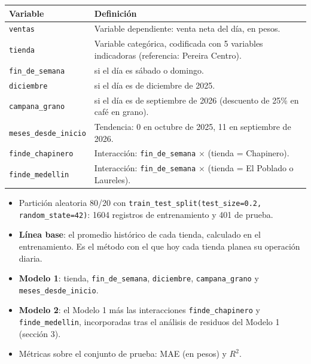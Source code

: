 \documentclass[11pt]{article}
\newcommand{\seccion}[1]{\par\vspace{6pt}{\large\bfseries\color{esumerNavy} #1}\par\vspace{1pt}}
\begin{document}
\small
\renewcommand{\arraystretch}{1.12}
\begin{tabularx}{\textwidth}{@{}>{\raggedright\arraybackslash}p{4.3cm} >{\raggedright\arraybackslash}X@{}}
\toprule
\textbf{Variable} & \textbf{Definición}\\
\midrule
\texttt{ventas} & Variable dependiente: venta neta del día, en pesos.\\
\texttt{tienda} & Variable categórica, codificada con 5 variables indicadoras (referencia: Pereira Centro).\\
\texttt{fin\_de\_semana} & 1 si el día es sábado o domingo.\\
\texttt{diciembre} & 1 si el día es de diciembre de 2025.\\
\texttt{campana\_grano} & 1 si el día es de septiembre de 2026 (descuento de 25\% en café en grano).\\
\texttt{meses\_desde\_inicio} & Tendencia: 0 en octubre de 2025, 11 en septiembre de 2026.\\
\texttt{finde\_chapinero} & Interacción: \texttt{fin\_de\_semana} $\times$ (tienda = Chapinero).\\
\texttt{finde\_medellin} & Interacción: \texttt{fin\_de\_semana} $\times$ (tienda = El Poblado o Laureles).\\
\bottomrule
\end{tabularx}\par
\renewcommand{\arraystretch}{1.0}
\normalsize

\seccion{2. Metodología}

\begin{itemize}[itemsep=1pt, topsep=1pt]
  \item Partición aleatoria 80/20 con \texttt{train\_test\_split(test\_size=0.2,
    random\_state=42)}: 1604 registros de entrenamiento y 401 de prueba.
  \item \textbf{Línea base}: el promedio histórico de cada tienda, calculado en
    el entrenamiento. Es el método con el que hoy cada tienda planea su
    operación diaria.
  \item \textbf{Modelo 1}: tienda, \texttt{fin\_de\_semana}, \texttt{diciembre},
    \texttt{campana\_grano} y \texttt{meses\_desde\_inicio}.
  \item \textbf{Modelo 2}: el Modelo 1 más las interacciones
    \texttt{finde\_chapinero} y \texttt{finde\_medellin}, incorporadas tras el
    análisis de residuos del Modelo 1 (sección 3).
  \item Métricas sobre el conjunto de prueba: MAE (en pesos) y $R^2$.
\end{itemize}
\end{document}
